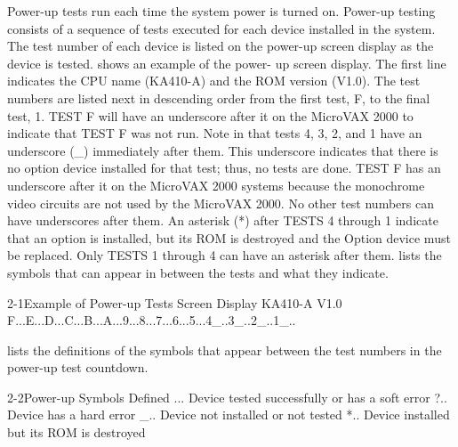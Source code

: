 Power-up tests run each time the system power is turned on. Power-up
testing consists of a sequence of tests executed for each device installed in
the system. The test number of each device is listed on the power-up screen
display as the device is tested.  shows an example of the power-
up screen display. The first line indicates the CPU name (KA410-A) and the
ROM version (V1.0). The test numbers are listed next in descending order
from the first test, F, to the final test, 1. TEST F will have an underscore
after it on the MicroVAX 2000 to indicate that TEST F was not run. Note in
 that tests 4, 3, 2, and 1 have an underscore (\_) immediately after
them. This underscore indicates that there is no option device installed for
that test; thus, no tests are done. TEST F has an underscore after it on the
MicroVAX 2000 systems because the monochrome video circuits are not
used by the MicroVAX 2000. No other test numbers can have underscores
after them. An asterisk (*) after TESTS 4 through 1 indicate that an option is
installed, but its ROM is destroyed and the Option device must be replaced.
Only TESTS 1 through 4 can have an asterisk after them.  lists
the symbols that can appear in between the tests and what they indicate.

\begin{ttfig}{2-1}{Example of Power-up Tests Screen Display}
KA410-A V1.0
F...E...D...C...B...A...9...8...7...6...5...4_..3_..2_..1_..
\end{ttfig}

 lists the definitions of the symbols that appear between the test
numbers in the power-up test countdown.

\begin{ttfig}{2-2}{Power-up Symbols Defined}
    ...  Device tested successfully or has a soft error
    ?..  Device has a hard error
    _..  Device not installed or not tested
    *..  Device installed but its ROM is destroyed
\end{ttfig}

